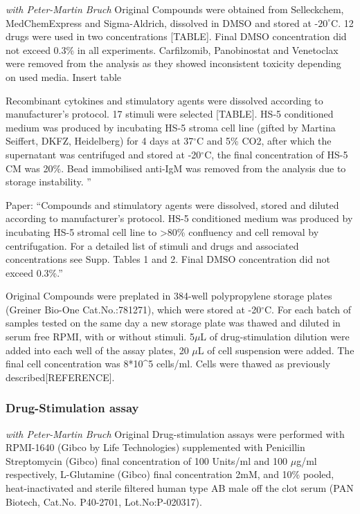 \documentclass[11pt, a4paper, twosided]{book}
\begin{document}
\emph{with Peter-Martin Bruch} Original
Compounds were obtained from Selleckchem, MedChemExpress and Sigma-Aldrich, dissolved in DMSO and stored at -\(20^\circ\)C. 12 drugs were used in two concentrations {[}TABLE{]}. Final DMSO concentration did not exceed 0.3\% in all experiments. Carfilzomib, Panobinostat and Venetoclax were removed from the analysis as they showed inconsistent toxicity depending on used media.
Insert table

Recombinant cytokines and stimulatory agents were dissolved according to manufacturer's protocol. 17 stimuli were selected {[}TABLE{]}. HS-5 conditioned medium was produced by incubating HS-5 stroma cell line (gifted by Martina Seiffert, DKFZ, Heidelberg) for 4 days at 37\(^\circ\)C and 5\% CO2, after which the supernatant was centrifuged and stored at -20\(^\circ\)C, the final concentration of HS-5 CM was 20\%. Bead immobilised anti-IgM was removed from the analysis due to storage instability. ''

Paper:
``Compounds and stimulatory agents were dissolved, stored and diluted according to manufacturer's protocol. HS-5 conditioned medium was produced by incubating HS-5 stromal cell line to \textgreater80\% confluency and cell removal by centrifugation. For a detailed list of stimuli and drugs and associated concentrations see Supp. Tables 1 and 2. Final DMSO concentration did not exceed 0.3\%.''

Original
Compounds were preplated in 384-well polypropylene storage plates (Greiner Bio-One Cat.No.:781271), which were stored at -20\(^\circ\)C. For each batch of samples tested on the same day a new storage plate was thawed and diluted in serum free RPMI, with or without stimuli. 5\(\mu\)L of drug-stimulation dilution were added into each well of the assay plates, 20 \(\mu\)L of cell suspension were added. The final cell concentration was 8*10\^{}5 cells/ml. Cells were thawed as previously described{[}REFERENCE{]}.

\hypertarget{drug-stimulation-assay}{%
\subsubsection{Drug-Stimulation assay}\label{drug-stimulation-assay}}

\emph{with Peter-Martin Bruch} Original
Drug-stimulation assays were performed with RPMI-1640 (Gibco by Life Technologies) supplemented with Penicillin Streptomycin (Gibco) final concentration of 100 Units/ml and 100 \(\mu\)g/ml respectively, L-Glutamine (Gibco) final concentration 2mM, and 10\% pooled, heat-inactivated and sterile filtered human type AB male off the clot serum (PAN Biotech, Cat.No. P40-2701, Lot.No:P-020317).
\end{document}
